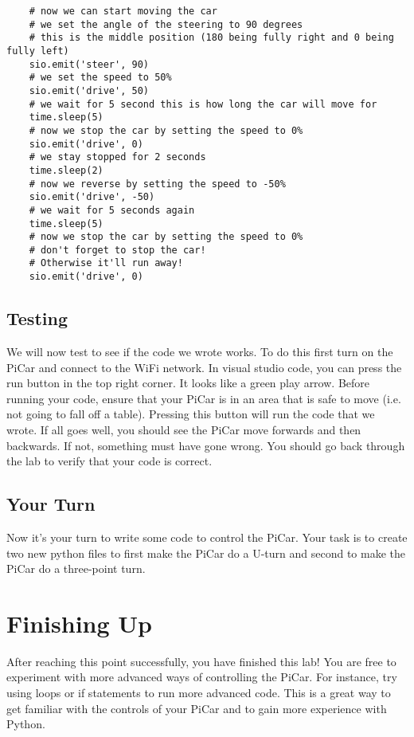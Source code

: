 \documentclass[12pt]{report}
\begin{document}
\begin{verbatim}
    # now we can start moving the car
    # we set the angle of the steering to 90 degrees
    # this is the middle position (180 being fully right and 0 being fully left)
    sio.emit('steer', 90)
    # we set the speed to 50%
    sio.emit('drive', 50)
    # we wait for 5 second this is how long the car will move for
    time.sleep(5)
    # now we stop the car by setting the speed to 0%
    sio.emit('drive', 0)
    # we stay stopped for 2 seconds
    time.sleep(2)
    # now we reverse by setting the speed to -50%
    sio.emit('drive', -50)
    # we wait for 5 seconds again
    time.sleep(5)
    # now we stop the car by setting the speed to 0%
    # don't forget to stop the car!
    # Otherwise it'll run away!
    sio.emit('drive', 0)
    \end{verbatim}

\section{Testing}
We will now test to see if the code we wrote works. To do this first turn on the PiCar and connect to the WiFi network. In visual studio code, you can press the run button in the top right corner. It looks like a green play arrow. Before running your code, ensure that your PiCar is in an area that is safe to move (i.e. not going to fall off a table). Pressing this button will run the code that we wrote. If all goes well, you should see the PiCar move forwards and then backwards. If not, something must have gone wrong. You should go back through the lab to verify that your code is correct.

\section{Your Turn}

Now it's your turn to write some code to control the PiCar. Your task is to create two new python files to first make the PiCar do a U-turn and second to make the PiCar do a three-point turn.

\chapter{Finishing Up}
After reaching this point successfully, you have finished this lab! You are free to experiment with more advanced ways of controlling the PiCar. For instance, try using loops or if statements to run more advanced code. This is a great way to get familiar with the controls of your PiCar and to gain more experience with Python.
\end{document}
